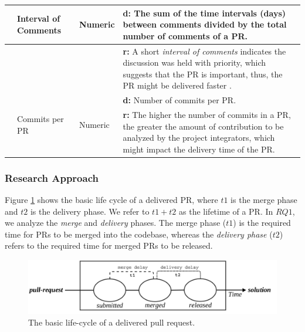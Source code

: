 \begin{table}[htbp]
\begin{tabular}{| >{\centering\arraybackslash}m{0.45in}|m{0.60in}|m{0.4in}|m{2.5in}|}
		& \multirow{5}{2cm}{Interval of Comments} & \multirow{5}{*}{Numeric} & \textbf{d:} 
		The sum of the time intervals (days) between comments divided by the total number of comments of a PR.   \\ \cline{4-4}
		& &  & \textbf{r:} A short \textit{interval of comments} indicates the discussion was held with priority, which suggests that the PR is important, thus, the PR might be delivered faster \citep{Da_Costa2016-cb}. \\ \cline{ 2- 4}
		
		& \multirow{5}{1.5cm}{Commits per PR} & \multirow{5}{*}{Numeric} & \textbf{d:} Number of commits per PR.
		\\ \cline{4-4}
		& &  & \textbf{r:} The higher the number of commits in a
		PR, the greater the amount of contribution to be analyzed by the project integrators, which might impact the delivery time of the PR.  
		\\ \hline
	\end{tabular}
	\label{tab_explanatory_variables_2}
\end{table}
\egroup

\subsubsection{Research Approach}

Figure \ref{fig_released_pull_request_life_cycle} shows the basic life cycle of a delivered PR, where $t1$ is the merge phase and $t2$ is the delivery phase. We refer to  $t1 + t2$ as the lifetime of a PR. In $RQ1$, we analyze the \textit{merge} and \textit{delivery} phases. The merge phase ($t1$) is the required time for PRs to be merged into the codebase, whereas the \textit{delivery phase} ($t2$) refers to the required time for merged PRs to be released. 

\begin{figure}[t]
	\centering
	\includegraphics[width=\columnwidth,keepaspectratio]{released_pull_request_life_cicle_2.png}
	\caption{The basic life-cycle of a delivered pull request.}
	\label{fig_released_pull_request_life_cycle}
\end{figure}


